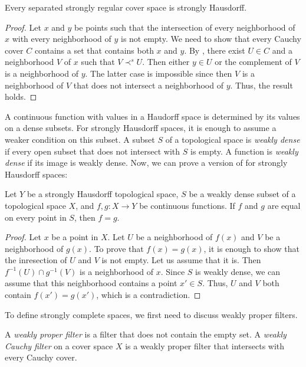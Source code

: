 \documentclass[reqno]{amsart}
\theoremstyle{definition}
\theoremstyle{remark}
\numberwithin{figure}{section}
\newcommand{\rb}{\prec}
\begin{document}
\begin{lem}
Every separated strongly regular cover space is strongly Hausdorff.
\end{lem}
\begin{proof}
Let $x$ and $y$ be points such that the intersection of every neighborhood of $x$ with every neighborhood of $y$ is not empty.
We need to show that every Cauchy cover $C$ contains a set that contains both $x$ and $y$.
By , there exist $U \in C$ and a neighborhood $V$ of $x$ such that $V \rb^s U$.
Then either $y \in U$ or the complement of $V$ is a neighborhood of $y$.
The latter case is impossible since then $V$ is a neighborhood of $V$ that does not intersect a neighborhood of $y$.
Thus, the result holds.
\end{proof}

A continuous function with values in a Haudorff space is determined by its values on a dense subsets.
For strongly Hausdorff spaces, it is enough to assume a weaker condition on this subset.
A subset $S$ of a topological space is \emph{weakly dense} if every open subset that does not intersect with $S$ is empty.
A function is \emph{weakly dense} if its image is weakly dense.
Now, we can prove a version of  for strongly Hausdorff spaces:

\begin{prop}
Let $Y$ be a strongly Hausdorff topological space, $S$ be a weakly dense subset of a topological space $X$, and $f,g : X \to Y$ be continuous functions.
If $f$ and $g$ are equal on every point in $S$, then $f = g$.
\end{prop}
\begin{proof}
Let $x$ be a point in $X$.
Let $U$ be a neighborhood of $f(x)$ and $V$ be a neighborhood of $g(x)$.
To prove that $f(x) = g(x)$, it is enough to show that the inresection of $U$ and $V$ is not empty.
Let us assume that it is.
Then $f^{-1}(U) \cap g^{-1}(V)$ is a neighborhood of $x$.
Since $S$ is weakly dense, we can assume that this neighborhood contains a point $x' \in S$.
Thus, $U$ and $V$ both contain $f(x') = g(x')$, which is a contradiction.
\end{proof}

To define strongly complete spaces, we first need to discuss weakly proper filters.

\begin{defn}
A \emph{weakly proper filter} is a filter that does not contain the empty set.
A \emph{weakly Cauchy filter} on a cover space $X$ is a weakly proper filter that intersects with every Cauchy cover.
\end{defn}
\end{document}
